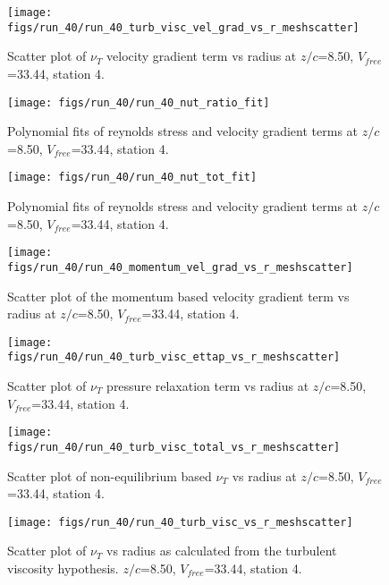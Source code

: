 \begin{figure}[H]
\centering
\texttt{[image: figs/run\_40/run\_40\_turb\_visc\_vel\_grad\_vs\_r\_meshscatter]}
\caption{Scatter plot of $\nu_T$ velocity gradient term vs radius at $z/c$=8.50, $V_{free}$=33.44, station 4.}
\end{figure}


\begin{figure}[H]
\centering
\texttt{[image: figs/run\_40/run\_40\_nut\_ratio\_fit]}
\caption{Polynomial fits of reynolds stress and velocity gradient terms at $z/c$=8.50, $V_{free}$=33.44, station 4.}
\end{figure}


\begin{figure}[H]
\centering
\texttt{[image: figs/run\_40/run\_40\_nut\_tot\_fit]}
\caption{Polynomial fits of reynolds stress and velocity gradient terms at $z/c$=8.50, $V_{free}$=33.44, station 4.}
\end{figure}


\begin{figure}[H]
\centering
\texttt{[image: figs/run\_40/run\_40\_momentum\_vel\_grad\_vs\_r\_meshscatter]}
\caption{Scatter plot of the momentum based velocity gradient term vs radius at $z/c$=8.50, $V_{free}$=33.44, station 4.}
\end{figure}


\begin{figure}[H]
\centering
\texttt{[image: figs/run\_40/run\_40\_turb\_visc\_ettap\_vs\_r\_meshscatter]}
\caption{Scatter plot of $\nu_T$ pressure relaxation term vs radius at $z/c$=8.50, $V_{free}$=33.44, station 4.}
\end{figure}


\begin{figure}[H]
\centering
\texttt{[image: figs/run\_40/run\_40\_turb\_visc\_total\_vs\_r\_meshscatter]}
\caption{Scatter plot of non-equilibrium based $\nu_T$ vs radius at $z/c$=8.50, $V_{free}$=33.44, station 4.}
\end{figure}


\begin{figure}[H]
\centering
\texttt{[image: figs/run\_40/run\_40\_turb\_visc\_vs\_r\_meshscatter]}
\caption{Scatter plot of $\nu_T$ vs radius as calculated from the turbulent viscosity hypothesis. $z/c$=8.50, $V_{free}$=33.44, station 4.}
\end{figure}


